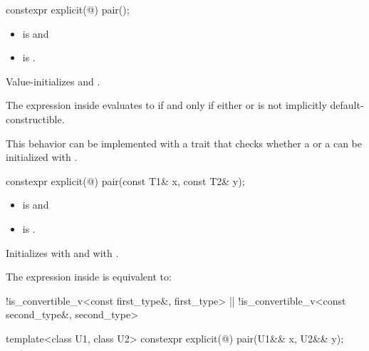 %
\begin{itemdecl}
constexpr explicit(@\seebelow@) pair();
\end{itemdecl}

\begin{itemdescr}
\pnum
\constraints
\begin{itemize}
\item {} is  and
\item {} is .
\end{itemize}

\pnum
\effects
Value-initializes  and .

\pnum
\remarks
The expression inside  evaluates to 
if and only if either  or
 is not implicitly default-constructible.
\begin{note}
This behavior can be implemented with a trait that checks
whether a  or a 
can be initialized with \tcode{\{\}}.
\end{note}
\end{itemdescr}

%
\begin{itemdecl}
constexpr explicit(@\seebelow@) pair(const T1& x, const T2& y);
\end{itemdecl}

\begin{itemdescr}
\pnum
\constraints
\begin{itemize}
\item {} is  and
\item {} is .
\end{itemize}

\pnum
\effects
Initializes  with  and  with .

\pnum
\remarks
The expression inside  is equivalent to:
\begin{codeblock}
!is_convertible_v<const first_type&, first_type> ||
  !is_convertible_v<const second_type&, second_type>
\end{codeblock}
\end{itemdescr}

%
\begin{itemdecl}
template<class U1, class U2> constexpr explicit(@\seebelow@) pair(U1&& x, U2&& y);
\end{itemdecl}


